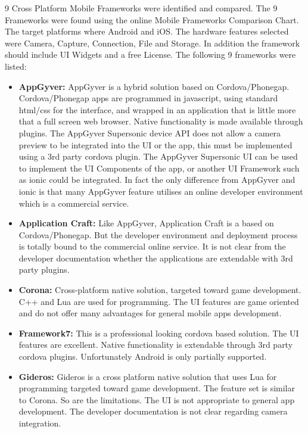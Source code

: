 9 Cross Platform Mobile Frameworks were identified and compared. The 9 Frameworks were  found using the online Mobile Frameworks Comparison Chart. The target platforms where Android and iOS. The hardware features selected were Camera, Capture, Connection, File and Storage. In addition the framework should include UI Widgets and a free License. The following 9 frameworks were listed:

\begin{itemize}[label={}]
\item \textbf{AppGyver:} AppGyver is a hybrid solution based on Cordova/Phonegap. Cordova/Phonegap apps are programmed in javascript, using standard html/css for the interface, and wrapped in an application that is little more that a full screen web browser. Native functionality is made available through plugins. The AppGyver Supersonic device API does not allow a camera preview to be integrated into the UI or the app, this must be implemented using a 3rd party cordova plugin. The AppGyver Supersonic UI can be used to implement the UI Components of the app, or another UI Framework such as ionic could be integrated. In fact the only difference from AppGyver and ionic is that many AppGyver feature utilises an online developer environment which is a commercial service.

\item \textbf{Application Craft:} Like AppGyver, Application Craft is a based on Cordova/Phonegap. But the developer environment and deployment process is totally bound to the commercial online service. It is not clear from the developer documentation whether the applications are extendable with 3rd party plugins.

\item \textbf{Corona:} Cross-platform native solution, targeted toward game development. C++ and Lua are used for programming. The UI features are game oriented and do not offer many advantages for general mobile apps development.

\item \textbf{Framework7:} This is a professional looking cordova based solution. The UI features are excellent. Native functionality is extendable through 3rd party cordova plugins. Unfortunately Android is only partially supported.

\item \textbf{Gideros:} Gideros is a cross platform native solution that uses Lua for programming targeted toward game development. The feature set is similar to Corona. So are the limitations. The UI is not appropriate to general app development. The developer documentation is not clear regarding camera integration.


\end{itemize}
